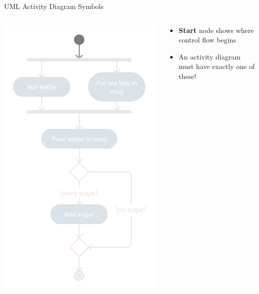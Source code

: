 \begin{frame}{UML Activity Diagram Symbols}
	\begin{columns}
		\begin{column}{0.4\textwidth}
			\includegraphics[width=\textwidth]{ad_start}
		\end{column}
		\begin{column}{0.58\textwidth}
			\begin{itemize}
				\pause\item \textbf{Start} node shows where control flow begins
				\pause\item An activity diagram must have exactly one of these!
			\end{itemize}
		\end{column}
	\end{columns}
\end{frame}

